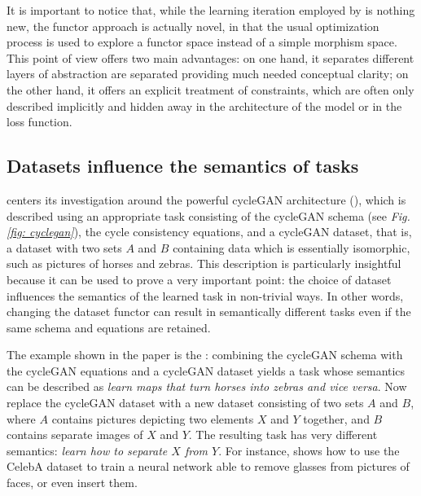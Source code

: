 \documentclass[11pt,a4paper,openright,twoside]{report}
\theoremstyle{plain}
\theoremstyle{definition}
\begin{document}
It is important to notice that, while the learning iteration employed by \cite{gavranovic2019compositional} is nothing new, the functor approach is actually novel, in that the usual optimization process is used to explore a functor space instead of a simple morphism space. This point of view offers two main advantages: on one hand, it separates different layers of abstraction are separated providing much needed conceptual clarity; on the other hand, it offers an explicit treatment of constraints, which are often only described implicitly and hidden away in the architecture of the model or in the loss function. 

\subsection{Datasets influence the semantics of tasks}

\cite{gavranovic2019compositional} centers its investigation around the powerful cycleGAN architecture (\cite{zhu2017unpaired}), which is described using an appropriate task consisting of the cycleGAN schema (see \textit{Fig. \ref{fig: cyclegan}}), the cycle consistency equations, and a cycleGAN dataset, that is, a dataset with two sets $A$ and $B$ containing data which is essentially isomorphic, such as pictures of horses and zebras. This description is particularly insightful because it can be used to prove a very important point: the choice of dataset influences the semantics of the learned task in non-trivial ways. In other words, changing the dataset functor can result in semantically different tasks even if the same schema and equations are retained. 


The example shown in the paper is the \cite{gavranovic2019compositional}: combining the cycleGAN schema with the cycleGAN equations and a cycleGAN dataset yields a task whose semantics can be described as \textit{learn maps that turn horses into zebras and vice versa}. Now replace the cycleGAN dataset with a new dataset consisting of two sets $A$ and $B$, where $A$ contains pictures depicting two elements $X$ and $Y$ together, and $B$ contains separate images of $X$ and $Y$. The resulting task has very different semantics: \textit{learn how to separate $X$ from $Y$}. For instance, \cite{gavranovic2019compositional} shows how to use the CelebA dataset to train a neural network able to remove glasses from pictures of faces, or even insert them.
\end{document}
